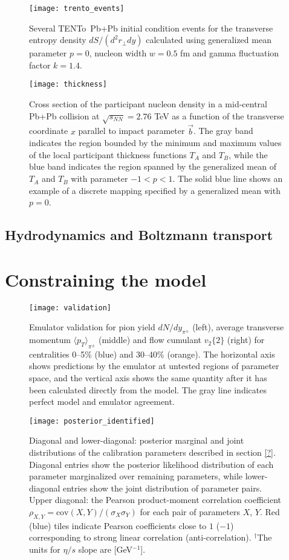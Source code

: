 \documentclass[aps,prc,reprint,amsmath]{revtex4-1}
\newcommand{\trento}{T\raisebox{-0.5ex}{R}ENTo}
\newcommand{\sqrts}{\sqrt{s_{NN}}}
\begin{document}
\begin{figure}
    \texttt{[image: trento\_events]}
    \caption{Several \protect\trento\ Pb+Pb initial condition events for the transverse entropy density $dS/(d^2r_\perp dy)$ calculated using generalized mean parameter $p=0$, nucleon width $w=0.5$ fm and gamma fluctuation factor $k=1.4$.}
\end{figure}

\begin{figure}[b]
    \texttt{[image: thickness]}
    \caption{Cross section of the participant nucleon density in a mid-central Pb+Pb collision at $\sqrts=2.76$ TeV as a function of the transverse coordinate $x$ parallel to impact parameter $\vec{b}$. The gray band indicates the region bounded by the minimum and maximum values of the local participant thickness functions $T_A$ and $T_B$, while the blue band indicates the region spanned by the generalized mean of $T_A$ and $T_B$ with parameter $-1<p<1$. The solid blue line shows an example of a discrete mapping specified by a generalized mean with $p=0$.} 
\end{figure}

\subsection{Hydrodynamics and Boltzmann transport}


\section{Constraining the model}

\begin{figure*}
    \texttt{[image: validation]}
    \caption{Emulator validation for pion yield $dN/dy_{\pi^\pm}$ (left), average transverse momentum ${\langle p_T \rangle}_{\pi^\pm}$ (middle) and flow cumulant $v_2\{2\}$ (right) for centralities 0--5\% (blue) and 30--40\% (orange). The horizontal axis shows predictions by the emulator at untested regions of parameter space, and the vertical axis shows the same quantity after it has been calculated directly from the model. The gray line indicates perfect model and emulator agreement.} 
\end{figure*}


\begin{figure*}
    \texttt{[image: posterior\_identified]}
    \caption{Diagonal and lower-diagonal: posterior marginal and joint distributions of the calibration parameters described in section \ref{?}. Diagonal entries show the posterior likelihood distribution of each parameter marginalized over remaining parameters, while lower-diagonal entries show the joint distribution of parameter pairs. Upper diagonal: the Pearson product-moment correlation coefficient $\rho_{X,Y}=\text{cov}(X,Y)/(\sigma_X \sigma_Y)$ for each pair of parameters $X$, $Y$. Red (blue) tiles indicate Pearson coefficients close to $1$ ($-1$) corresponding to strong linear correlation (anti-correlation). $^\dagger$The units for $\eta/s$ slope are [GeV$^{-1}$].}
    \label{fig:posterior_identified}
\end{figure*}
\end{document}
